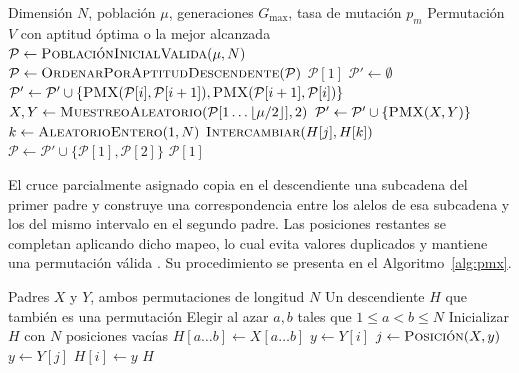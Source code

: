 \documentclass[11pt,a4paper,twocolumn]{article}
\begin{document}
\begin{algorithm}[H]
\caption{Algoritmo genético implementado para las N-Reinas}
\label{alg:nreinas}
\begin{algorithmic}[1]
\scriptsize
\Require Dimensión $N$, población $\mu$, generaciones $G_{\max}$, tasa de mutación $p_m$
\Ensure Permutación $V$ con aptitud óptima o la mejor alcanzada
\State $\mathcal{P}\gets \Call{PoblaciónInicialValida}{\mu, N}$
    \State $\mathcal{P}\gets \Call{OrdenarPorAptitudDescendente}{\mathcal{P}}$
        \State \Return $\mathcal{P}[1]$ 
    \EndIf
    \State $\mathcal{P}'\gets\emptyset$
     
        \State $\mathcal{P}'\gets \mathcal{P}' \cup \{\Call{PMX}{\mathcal{P}[i], \mathcal{P}[i+1]}, \Call{PMX}{\mathcal{P}[i+1], \mathcal{P}[i]}\}$
    \EndFor
     
        \State $X, Y \gets \Call{MuestreoAleatorio}{\mathcal{P}[1 \ldots \lfloor\mu/2\rfloor], 2}$
        \State $\mathcal{P}'\gets \mathcal{P}' \cup \{\Call{PMX}{X, Y}\}$
    \EndWhile
     
                \State $k \gets \Call{AleatorioEntero}{1, N}$
                \State $\Call{Intercambiar}{H[j], H[k]}$
            \EndIf
        \EndFor
    \EndFor
    \State $\mathcal{P}\gets \mathcal{P}' \cup \{\mathcal{P}[1], \mathcal{P}[2]\}$ 
\EndFor
\State \Return $\mathcal{P}[1]$
\end{algorithmic}
\end{algorithm}

El cruce parcialmente asignado copia en el descendiente una subcadena del
primer padre y construye una correspondencia entre los alelos de esa
subcadena y los del mismo intervalo en el segundo padre. Las posiciones
restantes se completan aplicando dicho mapeo, lo cual evita valores
duplicados y mantiene una permutación válida \cite{goldberg_lingle_pmx}.
Su procedimiento se presenta en el Algoritmo~\ref{alg:pmx}.

\begin{algorithm}[H]
\caption{Cruce parcialmente asignado (PMX)}
\label{alg:pmx}
\begin{algorithmic}[1]
\scriptsize
\Require Padres $X$ y $Y$, ambos permutaciones de longitud $N$
\Ensure Un descendiente $H$ que también es una permutación
\State Elegir al azar $a,b$ tales que $1\leq a<b\leq N$
\State Inicializar $H$ con $N$ posiciones vacías
\State $H[a\ldots b]\gets X[a\ldots b]$
        \State $y\gets Y[i]$
            \State $j\gets\Call{Posición}{X,y}$
            \State $y\gets Y[j]$
        \EndWhile
        \State $H[i]\gets y$
    \EndIf
\EndFor
\State \Return $H$
\end{algorithmic}
\end{algorithm}
\end{document}
